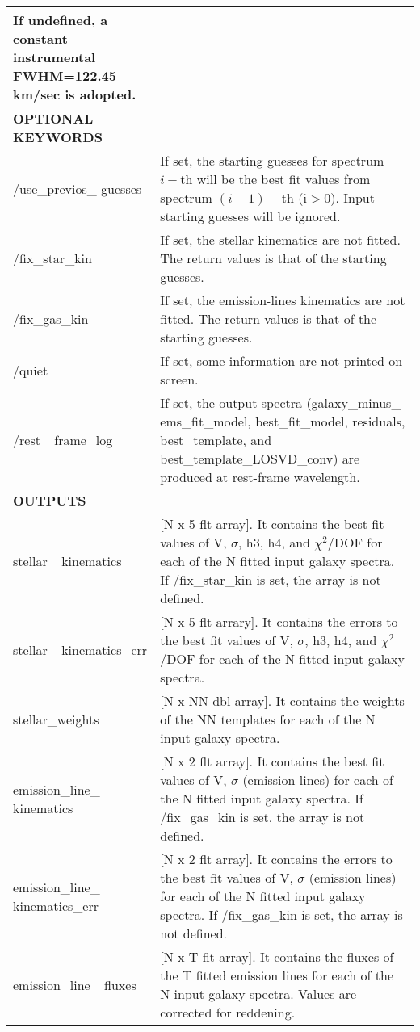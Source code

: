 \begin{center}
\begin{longtable}{p{2.7cm}| p{11.1cm}}
                               If undefined, a constant instrumental FWHM=122.45 km/sec is adopted. \\
\hline 
 {\bf OPTIONAL KEYWORDS}  &  \\
\hline
 /use\_previos\_ guesses &  If set, the starting guesses for spectrum $i-$th
                       will be the best fit values from spectrum
                      $(i-1)-$th (i$>0$). Input starting guesses will be ignored.\\
 /fix\_star\_kin  &        If set, the stellar kinematics are not
                       fitted. The return values is that of the starting guesses. \\
%
 /fix\_gas\_kin   &        If set, the emission-lines kinematics are not fitted. The return values is that of the starting guesses. \\
%
/quiet     &            If set, some information are not printed on screen.\\
%
/rest\_ frame\_log & If set, the output spectra (galaxy\_minus\_ ems\_fit\_model, best\_fit\_model, residuals, 
             best\_template, and best\_template\_LOSVD\_conv) are produced at rest-frame wavelength.\\
\hline
%
 {\bf OUTPUTS} &  \\
\hline
  stellar\_ kinematics   &  [N x 5 flt array].  It contains the best fit values of V, $\sigma$, h3, h4, and $\chi^2$/DOF for each of the N fitted input galaxy spectra. If /fix\_star\_kin is set, the array is not defined.\\
  stellar\_ kinematics\_err &[N x 5 flt arrary].  It contains the errors to the best fit values of V, $\sigma$, h3, h4, and $\chi^2$/DOF for each of the N fitted input galaxy spectra.\\
  stellar\_weights        &[N x NN dbl array]. It contains the weights of the NN templates for each of the N input galaxy spectra.\\
  emission\_line\_ kinematics &[N x 2 flt array].  It contains the best fit values of V, $\sigma$ (emission lines) for each of the N fitted
                            input galaxy spectra. If /fix\_gas\_kin is set, the array is not defined.\\
 emission\_line\_ kinematics\_err & [N x 2 flt array].  It contains the errors to the best fit values of V, $\sigma$ (emission lines) for each of the N fitted input galaxy spectra. If /fix\_gas\_kin is set, the array is not defined.\\
 emission\_line\_ fluxes  &[N x T flt array].  It contains the fluxes of the T fitted emission lines for each of the N input galaxy spectra. Values are corrected for reddening.\\

\end{longtable}
\end{center}
